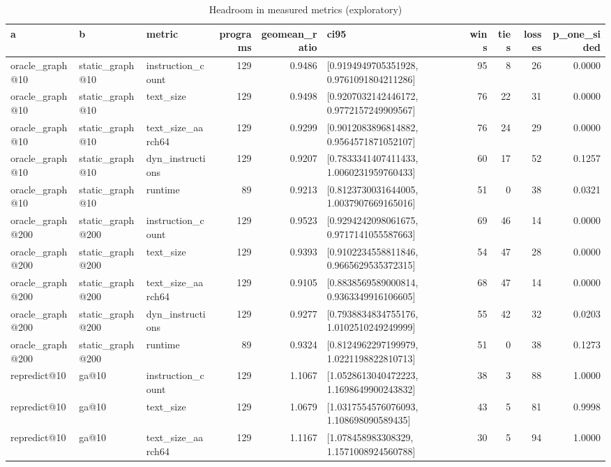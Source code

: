 \begin{table}[t]
\centering
\caption{Headroom in measured metrics (exploratory)}
\label{tab:v3-1-analysis-B-metrics}
\begin{tabular}{lllrrlrrrr}
\toprule
a & b & metric & programs & geomean\_ratio & ci95 & wins & ties & losses & p\_one\_sided \\
\midrule
oracle\_graph@10 & static\_graph@10 & instruction\_count & 129 & 0.9486 & [0.9194949705351928, 0.9761091804211286] & 95 & 8 & 26 & 0.0000 \\
oracle\_graph@10 & static\_graph@10 & text\_size & 129 & 0.9498 & [0.9207032142446172, 0.9772157249909567] & 76 & 22 & 31 & 0.0000 \\
oracle\_graph@10 & static\_graph@10 & text\_size\_aarch64 & 129 & 0.9299 & [0.9012083896814882, 0.9564571871052107] & 76 & 24 & 29 & 0.0000 \\
oracle\_graph@10 & static\_graph@10 & dyn\_instructions & 129 & 0.9207 & [0.7833341407411433, 1.0060231959760433] & 60 & 17 & 52 & 0.1257 \\
oracle\_graph@10 & static\_graph@10 & runtime & 89 & 0.9213 & [0.8123730031644005, 1.0037907669165016] & 51 & 0 & 38 & 0.0321 \\
oracle\_graph@200 & static\_graph@200 & instruction\_count & 129 & 0.9523 & [0.9294242098061675, 0.9717141055587663] & 69 & 46 & 14 & 0.0000 \\
oracle\_graph@200 & static\_graph@200 & text\_size & 129 & 0.9393 & [0.9102234558811846, 0.9665629535372315] & 54 & 47 & 28 & 0.0000 \\
oracle\_graph@200 & static\_graph@200 & text\_size\_aarch64 & 129 & 0.9105 & [0.8838569589000814, 0.9363349916106605] & 68 & 47 & 14 & 0.0000 \\
oracle\_graph@200 & static\_graph@200 & dyn\_instructions & 129 & 0.9277 & [0.7938834834755176, 1.0102510249249999] & 55 & 42 & 32 & 0.0203 \\
oracle\_graph@200 & static\_graph@200 & runtime & 89 & 0.9324 & [0.8124962297199979, 1.0221198822810713] & 51 & 0 & 38 & 0.1273 \\
repredict@10 & ga@10 & instruction\_count & 129 & 1.1067 & [1.0528613040472223, 1.1698649900243832] & 38 & 3 & 88 & 1.0000 \\
repredict@10 & ga@10 & text\_size & 129 & 1.0679 & [1.0317554576076093, 1.108698090589435] & 43 & 5 & 81 & 0.9998 \\
repredict@10 & ga@10 & text\_size\_aarch64 & 129 & 1.1167 & [1.078458983308329, 1.1571008924560788] & 30 & 5 & 94 & 1.0000 \\

\end{tabular}
\end{table}
